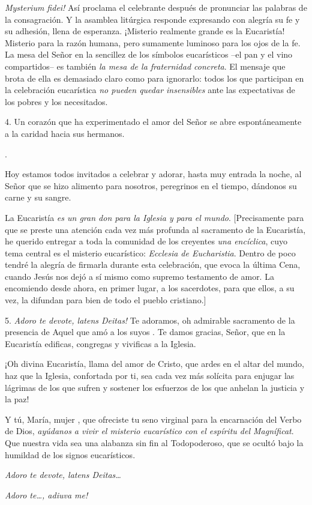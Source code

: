 \begin{body}
\newpage 
\textit{Mysterium fidei!} Así proclama el celebrante después de pronunciar las palabras de la consagración. Y la asamblea litúrgica responde expresando con alegría su fe y su adhesión, llena de esperanza. ¡Misterio realmente grande es la Eucaristía! Misterio  para la razón humana, pero sumamente luminoso para los ojos de la fe. La mesa del Señor en la sencillez de los símbolos eucarísticos –el pan y el vino compartidos– es también \textit{la mesa de la fraternidad concreta}. El mensaje que brota de ella es demasiado claro como para ignorarlo: todos los que participan en la celebración eucarística \textit{no pueden quedar insensibles} ante las expectativas de los pobres y los necesitados.

4.  Un corazón que ha experimentado el amor del Señor se abre espontáneamente a la caridad hacia sus hermanos.

.

Hoy estamos todos invitados a celebrar y adorar, hasta muy entrada la noche, al Señor que se hizo alimento para nosotros, peregrinos en el tiempo, dándonos su carne y su sangre.

La Eucaristía \textit{es un gran don para la Iglesia y para el mundo}. {[Precisamente para que se preste una atención cada vez más profunda al sacramento de la Eucaristía, he querido entregar a toda la comunidad de los creyentes \textit{una encíclica}, cuyo tema central es el misterio eucarístico: \textit{Ecclesia de Eucharistia}. Dentro de poco tendré la alegría de firmarla durante esta celebración, que evoca la última Cena, cuando Jesús nos dejó a sí mismo como supremo testamento de amor. La encomiendo desde ahora, en primer lugar, a los sacerdotes, para que ellos, a su vez, la difundan para bien de todo el pueblo cristiano.]}

5. \textit{Adoro te devote, latens Deitas!} Te adoramos, oh admirable sacramento de la presencia de Aquel que amó a los suyos . Te damos gracias, Señor, que en la Eucaristía edificas, congregas y vivificas a la Iglesia.

¡Oh divina Eucaristía, llama del amor de Cristo, que ardes en el altar del mundo, haz que la Iglesia, confortada por ti, sea cada vez más solícita para enjugar las lágrimas de los que sufren y sostener los esfuerzos de los que anhelan la justicia y la paz!

Y tú, María, mujer , que ofreciste tu seno virginal para la encarnación del Verbo de Dios, \textit{ayúdanos a vivir el misterio eucarístico con el espíritu del Magníficat}. Que nuestra vida sea una alabanza sin fin al Todopoderoso, que se ocultó bajo la humildad de los signos eucarísticos.

\textit{Adoro te devote, latens Deitas\ldots}

\textit{Adoro te\ldots, adiuva me!}
\end{body}

